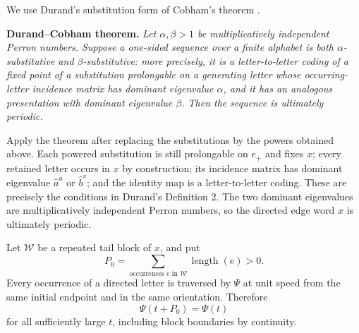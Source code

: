 \documentclass[11pt]{article}
\theoremstyle{definition}
\theoremstyle{remark}
\begin{document}
We use Durand's substitution form of Cobham's theorem
\cite[Definition 2 and Theorem 1]{Durand}.

\medskip
\noindent\textbf{Durand--Cobham theorem.}
\emph{Let \(\alpha,\beta>1\) be multiplicatively independent Perron
numbers.  Suppose a one-sided sequence over a finite alphabet is both
\(\alpha\)-substitutive and \(\beta\)-substitutive: more precisely, it is a
letter-to-letter coding of a fixed point of a substitution prolongable on a
generating letter whose occurring-letter incidence matrix has dominant
eigenvalue \(\alpha\), and it has an analogous presentation with dominant
eigenvalue \(\beta\).  Then the sequence is ultimately periodic.}
\medskip

Apply the theorem after replacing the substitutions by the powers obtained
above.  Each powered substitution is still prolongable on $e_+$ and fixes
$x$; every retained letter occurs in $x$ by construction; its incidence
matrix has dominant eigenvalue $\widehat a^{u}$ or $\widehat b^{v}$; and
the identity map is a letter-to-letter coding.  These are precisely the
conditions in Durand's Definition 2.  The two dominant eigenvalues are
multiplicatively independent Perron numbers, so the directed edge word $x$
is ultimately periodic.

Let \(\mathcal W\) be a repeated tail block of \(x\), and put
\begin{equation}\label{term:eq:period-length}
 P_0=\sum_{\text{occurrences }e\text{ in }\mathcal W}
          \operatorname{length}(e)>0.
\end{equation}
Every occurrence of a directed letter is traversed by \(\Psi\) at unit speed
from the same initial endpoint and in the same orientation.  Therefore
\begin{equation}\label{term:eq:eventual-metric-period}
 \Psi(t+P_0)=\Psi(t)
\end{equation}
for all sufficiently large \(t\), including block boundaries by continuity.
\end{document}
